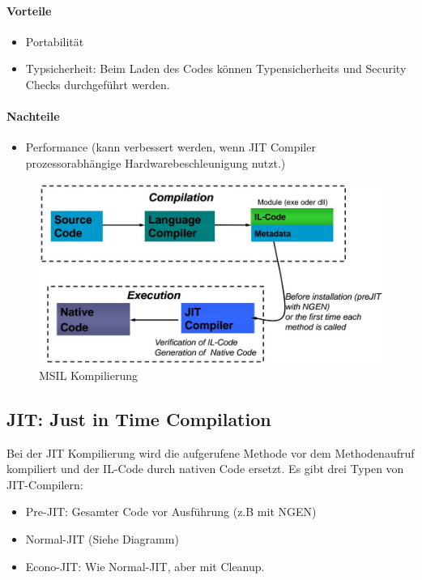 \documentclass[
a4paper,
oneside,
10pt,
fleqn,
headsepline,
toc=listofnumbered, 
bibliography=totocnumbered]{scrartcl}
\begin{document}
\paragraph{Vorteile}
\begin{itemize}
	\item Portabilität
	\item Typsicherheit: Beim Laden des Codes können Typensicherheits und Security Checks durchgeführt werden.
\end{itemize}
\paragraph{Nachteile}
\begin{itemize}
	\item Performance (kann verbessert werden, wenn JIT Compiler prozessorabhängige Hardwarebeschleunigung nutzt.)
\end{itemize}

\begin{figure}[ht]
	\centering
	\includegraphics[width=0.7\linewidth]{images/msil_compilation}
	\caption{MSIL Kompilierung}
	\label{fig:msilcompilation}
\end{figure}

\subsection{JIT: Just in Time Compilation}
Bei der JIT Kompilierung wird die aufgerufene Methode vor dem Methodenaufruf kompiliert und der IL-Code durch nativen Code ersetzt. Es gibt drei Typen von JIT-Compilern:
\begin{itemize}
	\item Pre-JIT: Gesamter Code vor Ausführung (z.B mit NGEN)
	\item Normal-JIT (Siehe Diagramm)
	\item Econo-JIT: Wie Normal-JIT, aber mit Cleanup.
\end{itemize}
\end{document}
